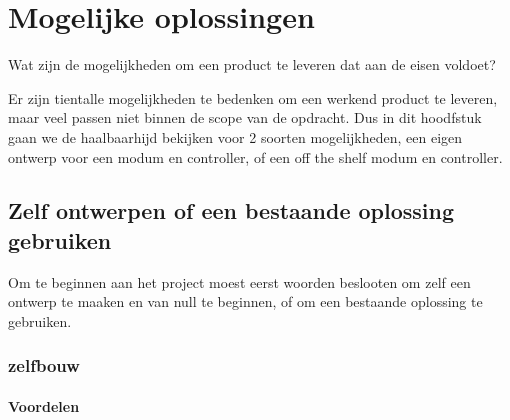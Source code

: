 \chapter{Mogelijke oplossingen}
\label{Mogelijke_oplossingen}

\begin{center}
    \begin{minipage}{0.5\textwidth}
        \begin{small}
            Wat zijn de mogelijkheden om een product te leveren dat aan de
            eisen voldoet?
        \end{small} 
    \end{minipage}
    \vspace{0.5cm}
\end{center}

Er zijn tientalle  mogelijkheden te bedenken om een werkend product te
leveren, maar veel passen niet binnen de scope van de opdracht. Dus in dit
hoodfstuk gaan we de haalbaarhijd bekijken voor 2 soorten mogelijkheden,
een eigen ontwerp voor een modum en controller, of een off the shelf
modum en controller.

\section{Zelf ontwerpen of een bestaande oplossing gebruiken}

Om te beginnen aan het project moest eerst woorden beslooten om zelf een
ontwerp te maaken en van null te beginnen, of om een bestaande oplossing te
gebruiken.

\subsection{zelfbouw}



\subsubsection{Voordelen}



